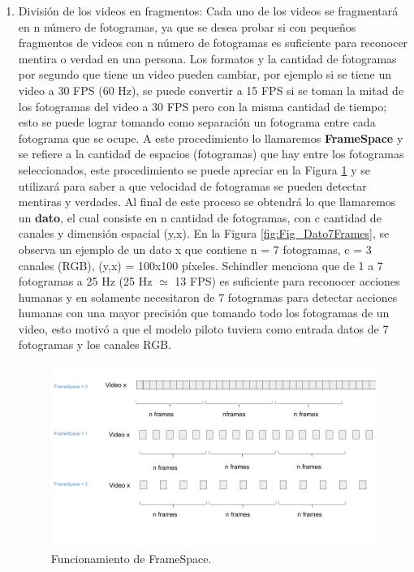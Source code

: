 \begin{onehalfspacing}
\begin{enumerate}
    \item División de los videos en fragmentos: Cada uno de los videos se fragmentará en n número de fotogramas, ya que se desea probar si con pequeños fragmentos de videos con n número de fotogramas es suficiente para reconocer mentira o verdad en una persona. Los formatos y la cantidad de fotogramas por segundo que tiene un video pueden cambiar, por ejemplo si se tiene un video a 30 FPS (60 Hz), se puede convertir a 15 FPS si se toman la mitad de los fotogramas del video a 30 FPS pero con la misma cantidad de tiempo; esto se puede lograr tomando como separación un fotograma entre cada fotograma que se ocupe. A este procedimiento lo llamaremos \textbf{FrameSpace} y se refiere a la cantidad de espacios (fotogramas) que hay entre los fotogramas seleccionados, este procedimiento se puede apreciar en la Figura \ref{fig:Fig_FrameSpace} y se utilizará para saber a que velocidad de fotogramas se pueden detectar mentiras y verdades. Al final de este proceso se obtendrá lo que llamaremos un \textbf{dato}, el cual consiste en n cantidad de fotogramas, con c cantidad de canales y dimensión espacial (y,x). En la Figura \ref{fig:Fig_Dato7Frames}, se observa un ejemplo de un dato x que contiene n = 7 fotogramas, c = 3 canales (RGB), (y,x) = 100x100 píxeles. Schindler \cite{SchindlerVanRequire} menciona que de 1 a 7 fotogramas a 25 Hz (25 Hz $\simeq$ 13 FPS) es suficiente para reconocer acciones humanas y en \cite{Ji20133DRecognition} solamente necesitaron de 7 fotogramas para detectar acciones humanas con una mayor precisión que tomando todo los fotogramas de un video, esto motivó a que el modelo piloto tuviera como entrada datos de 7 fotogramas y los canales RGB.
    
    \begin{figure}[h!]
    	\centering
    	\includegraphics[width=14cm,keepaspectratio]{XX_Figures/Fig_FrameSpace.png}
    	\caption{\footnotesize Funcionamiento de FrameSpace.}
    	\label{fig:Fig_FrameSpace}
    \end{figure}
    

\end{enumerate}
\end{onehalfspacing}
